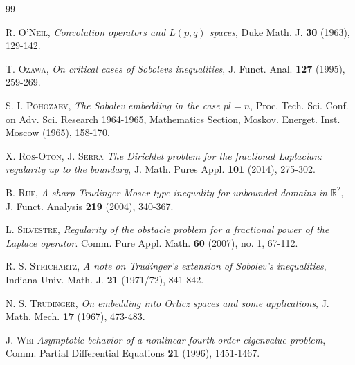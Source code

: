 \documentclass[11pt, a4paper]{article}
\newcommand{\R}{\mathbb{R}}
\begin{document}
\begin{thebibliography}{99}
\begin{small}
 \textsc{R. O'Neil}, \emph{Convolution operators and $L(p,q)$ spaces}, Duke Math. J. \textbf{30} (1963), 129-142.
 
 \textsc{T. Ozawa}, \emph{On critical cases of Sobolevs inequalities}, J. Funct. Anal. \textbf{127} (1995), 259-269.
 
 \textsc{S. I. Pohozaev}, \emph{The Sobolev embedding in the case
 $pl=n$}, Proc. Tech. Sci. Conf. on Adv. Sci. Research 1964-1965, Mathematics Section, Moskov. Energet. Inst. Moscow (1965), 158-170.
 


 \textsc{X. Ros-Oton, J. Serra} \emph{The Dirichlet problem for the fractional Laplacian: regularity up to the boundary}, J. Math. Pures Appl. \textbf{101} (2014), 275-302.

 \textsc{B. Ruf,} \emph{A sharp Trudinger-Moser type inequality for unbounded domains in $\R^{2}$}, J. Funct. Analysis  \textbf{219} (2004), 340-367.

 \textsc{L. Silvestre}, \emph{Regularity of the obstacle problem for a fractional power of the Laplace operator}. Comm. Pure Appl. Math. \textbf{60} (2007), no. 1, 67-112.


 \textsc{R. S. Strichartz}, \emph{A note on Trudinger's extension of Sobolev's inequalities}, Indiana Univ. Math. J. \textbf{21} (1971/72), 841-842.


 \textsc{N. S. Trudinger,} \emph{On embedding into Orlicz spaces and some applications}, J. Math. Mech. \textbf{17} (1967), 473-483.

 \textsc{J. Wei} \emph{Asymptotic behavior of a nonlinear fourth order eigenvalue problem}, Comm. Partial Differential Equations \textbf{21} (1996), 1451-1467.


\end{small}
\end{thebibliography}
\end{document}
